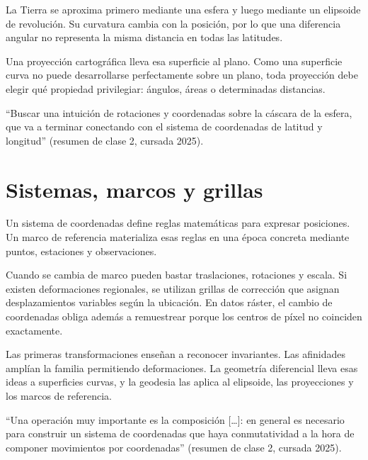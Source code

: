 La Tierra se aproxima primero mediante una esfera y luego mediante un elipsoide de revolución.
Su curvatura cambia con la posición, por lo que una diferencia angular no representa la misma
distancia en todas las latitudes.

Una proyección cartográfica lleva esa superficie al plano. Como una superficie curva no puede
desarrollarse perfectamente sobre un plano, toda proyección debe elegir qué propiedad
privilegiar: ángulos, áreas o determinadas distancias.

\begin{idea}
``Buscar una intuición de rotaciones y coordenadas sobre la cáscara de la esfera, que va
a terminar conectando con el sistema de coordenadas de latitud y longitud'' (resumen de clase 2, cursada 2025).
\end{idea}

\section{Sistemas, marcos y grillas}\label{sec:sistemas-marcos}

Un sistema de coordenadas define reglas matemáticas para expresar posiciones. Un marco de
referencia materializa esas reglas en una época concreta mediante puntos, estaciones y
observaciones.

Cuando se cambia de marco pueden bastar traslaciones, rotaciones y escala. Si existen
deformaciones regionales, se utilizan grillas de corrección que asignan desplazamientos
variables según la ubicación. En datos ráster, el cambio de coordenadas obliga además a
remuestrear porque los centros de píxel no coinciden exactamente.

\begin{resultado}
Las primeras transformaciones enseñan a reconocer invariantes. Las afinidades amplían la
familia permitiendo deformaciones. La geometría diferencial lleva esas ideas a superficies
curvas, y la geodesia las aplica al elipsoide, las proyecciones y los marcos de referencia.
\end{resultado}

\begin{idea}
``Una operación muy importante es la composición [\ldots]: en general es necesario para
construir un sistema de coordenadas que haya conmutatividad a la hora de componer
movimientos por coordenadas'' (resumen de clase 2, cursada 2025).
\end{idea}

